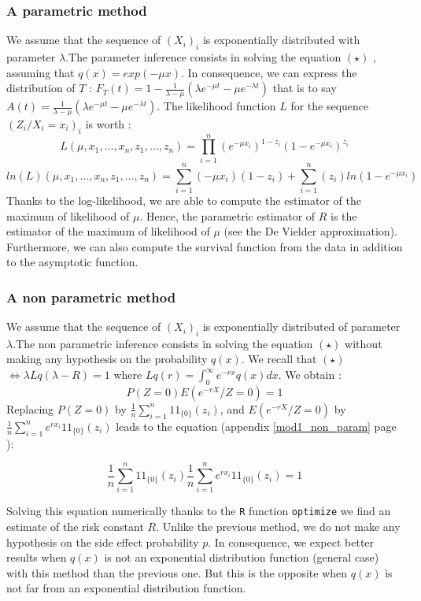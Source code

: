 \documentclass[12pt,twoside]{article}
\begin{document}
\subsubsection{A parametric method}
We assume that the sequence of $(X_i)_i$ is exponentially distributed with parameter $\lambda$.The 
parameter inference consists in solving the equation $(\star)$ , 
assuming that $q(x)=exp(-\mu x)$. In consequence, we can express the distribution of $T$ :  
$F_T(t)=1-\frac{1}{\lambda - \mu}(\lambda e^{-\mu t}-\mu e^{-\lambda t})$ that is to 
say $A(t)=\frac{1}{\lambda - \mu}(\lambda e^{-\mu t}-\mu e^{-\lambda t})$. 
The likelihood function $L$ for the sequence $(Z_i / X_i=x_i)_i$ is worth :
$$
L(\mu,x_1,\dots,x_n,z_1,\dots,z_n) = \prod_{i=1}^n (e^{-\mu x_i})^{1-z_i}(1-e^{-\mu x_i})^{z_i}
$$
$$
ln(L)(\mu,x_1,\dots,x_n,z_1,\dots,z_n) = \sum_{i=1}^n (-\mu x_i)(1-z_i)+  \sum_{i=1}^n(z_i)ln(1-e^{-\mu x_i}) 
$$
Thanks to the log-likelihood, we are able to compute the estimator of the maximum of likelihood of $\mu$. 
Hence, the parametric estimator of $R$ is the estimator of the maximum of likelihood of $\mu$ 
(see the De Vielder approximation). Furthermore, we can also compute the survival function from the data 
in addition to the asymptotic function.
 


\subsubsection{A non parametric method}

We assume that the sequence of $(X_i)_i$ is exponentially distributed of parameter $\lambda$.The non 
parametric inference consists in solving the equation $(\star)$ without making any hypothesis on the probability $q(x)$. 
We recall that $(\star)$ $ \Leftrightarrow \lambda Lq(\lambda-R) = 1$ where
$Lq(r) = \int_0^{\infty} e^{-r x }q(x) dx$.
We obtain :
$$
P(Z=0)E(e^{-r X}/Z=0) = 1
$$
Replacing $P(Z=0)$ by  $\frac{1}{n}\sum_{i=1}^n {1\!\!1}_{\{0\}}(z_i)$, 
and $E(e^{-r X}/Z=0)$ by $\frac{1}{n}\sum_{i=1}^n e^{r x_i}{1\!\!1}_{\{0\}}(z_i)$ 
leads to the equation (appendix \ref{mod1_non_param} page \pageref{mod1_non_param}):

$$ \frac{1}{n}\sum_{i=1}^n {1\!\!1}_{\{0\}}(z_i) \frac{1}{n}\sum_{i=1}^n e^{r x_i}{1\!\!1}_{\{0\}}(z_i) =1 $$ 

Solving this equation numerically thanks to the \texttt{R} function 
\texttt{optimize} we find an estimate of
the risk constant $R$. Unlike the previous method, we do not make any hypothesis on the
side effect probability $p$. In consequence, we expect better results when $q(x)$ is not an 
exponential distribution function (general case) with this method than the previous one.
But this is the opposite when $q(x)$ is not far from an exponential distribution function.
\end{document}

